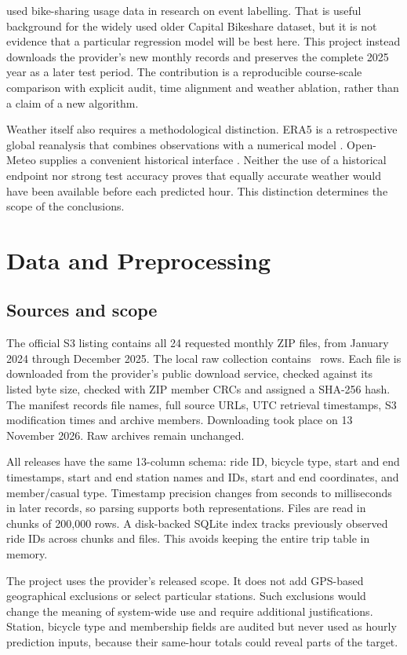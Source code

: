 \documentclass[10pt]{article}
\begin{document}
\citet{fanaee2014event} used bike-sharing usage data in research on event labelling. That is useful background for the widely used older Capital Bikeshare dataset, but it is not evidence that a particular regression model will be best here. This project instead downloads the provider's new monthly records and preserves the complete 2025 year as a later test period. The contribution is a reproducible course-scale comparison with explicit audit, time alignment and weather ablation, rather than a claim of a new algorithm.

Weather itself also requires a methodological distinction. ERA5 is a retrospective global reanalysis that combines observations with a numerical model \citep{hersbach2020era5}. Open-Meteo supplies a convenient historical interface \citep{zippenfenig2023openmeteo,openmeteo}. Neither the use of a historical endpoint nor strong test accuracy proves that equally accurate weather would have been available before each predicted hour. This distinction determines the scope of the conclusions.

\section{Data and Preprocessing}
\subsection{Sources and scope}
The official S3 listing contains all 24 requested monthly ZIP files, from January 2024 through December 2025. The local raw collection contains \NRaw\ rows. Each file is downloaded from the provider's public download service, checked against its listed byte size, checked with ZIP member CRCs and assigned a SHA-256 hash. The manifest records file names, full source URLs, UTC retrieval timestamps, S3 modification times and archive members. Downloading took place on 13 November 2026. Raw archives remain unchanged.

All releases have the same 13-column schema: ride ID, bicycle type, start and end timestamps, start and end station names and IDs, start and end coordinates, and member/casual type. Timestamp precision changes from seconds to milliseconds in later records, so parsing supports both representations. Files are read in chunks of 200,000 rows. A disk-backed SQLite index tracks previously observed ride IDs across chunks and files. This avoids keeping the entire trip table in memory.

The project uses the provider's released scope. It does not add GPS-based geographical exclusions or select particular stations. Such exclusions would change the meaning of system-wide use and require additional justifications. Station, bicycle type and membership fields are audited but never used as hourly prediction inputs, because their same-hour totals could reveal parts of the target.
\end{document}
